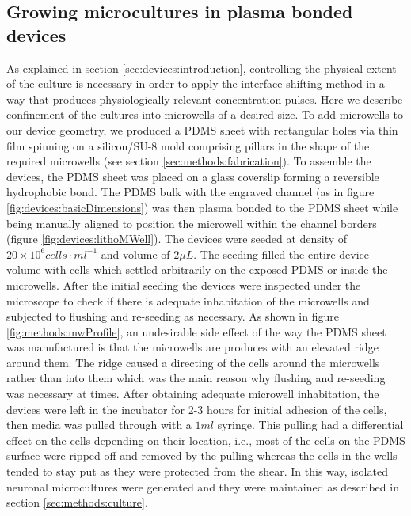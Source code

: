         \subsection{Growing microcultures in plasma bonded devices}
        \label{sec:devices:microcultures}

        As explained in section \ref{sec:devices:introduction}, controlling the physical extent of the culture is necessary in order to apply the interface shifting method in a way that produces physiologically relevant concentration pulses. Here we describe confinement of the cultures into microwells of a desired size. To add microwells to our device geometry, we produced a PDMS sheet with rectangular holes via thin film spinning on a silicon/SU-8 mold comprising pillars in the shape of the required microwells (see section \ref{sec:methods:fabrication}). To assemble the devices, the PDMS sheet was placed on a glass coverslip forming a reversible hydrophobic bond. The PDMS bulk with the engraved channel (as in figure \ref{fig:devices:basicDimensions}) was then plasma bonded to the PDMS sheet while being manually aligned to position the microwell within the channel borders (figure \ref{fig:devices:lithoMWell}). The devices were seeded at density of \(20\times10^6 cells\cdot ml^{-1}\) and volume of \(2 \mu L\). The seeding filled the entire device volume with cells which settled arbitrarily on the exposed PDMS or inside the microwells. After the initial seeding the devices were inspected under the microscope to check if there is adequate inhabitation of the microwells and subjected to flushing and re-seeding as necessary. As shown in figure \ref{fig:methods:mwProfile}, an undesirable side effect of the way the PDMS sheet was manufactured is that the microwells are produces with an elevated ridge around them. The ridge caused a directing of the cells around the microwells rather than into them which was the main reason why flushing and re-seeding was necessary at times. After obtaining adequate microwell inhabitation, the devices were left in the incubator for 2-3 hours for initial adhesion of the cells, then media was pulled through with a \(1 ml\) syringe. This pulling had a differential effect on the cells depending on their location, i.e., most of the cells on the PDMS surface were ripped off and removed by the pulling whereas the cells in the wells tended to stay put as they were protected from the shear. In this way, isolated neuronal microcultures were generated and they were maintained as described in section \ref{sec:methods:culture}.


